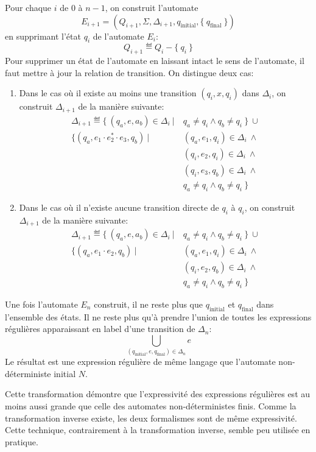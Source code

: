Pour chaque $i$ de $0$ à $n-1$, on construit l'automate \[E_{i+1} = (Q_{i+1}, \Sigma, \Delta_{i+1}, q_\text{initial}, \{\ q_\text{final}\ \})\] en supprimant l'état $q_i$ de l'automate $E_i$:
\[
Q_{i+1} \eqdef Q_i - \{\ q_i\ \}
\]
Pour supprimer un état de l'automate en laissant intact le sens de l'automate, il faut mettre à jour la relation de transition.
On distingue deux cas:
\begin{enumerate}
\item Dans le cas où il existe au moins une transition $(q_i, x, q_i)$ dans $\Delta_i$, on construit $\Delta_{i+1}$ de la manière suivante:
\begin{align*}
\Delta_{i+1} \eqdef \{\ (q_a, e, a_b) \in \Delta_i\ |\ &q_a \neq q_i \wedge q_b \neq q_i\ \}\ \cup\\
\{ (q_a, e_1 \cdot e_2^* \cdot e_3, q_b)\ |\ &(q_a, e_1, q_i) \in \Delta_i\ \wedge\\
&(q_i, e_2, q_i) \in \Delta_i\ \wedge\\
&(q_i, e_3, q_b) \in \Delta_i\ \wedge\\
&q_a \neq q_i \wedge q_b \neq q_i\ \}
\end{align*}
\item
Dans le cas où il n'existe aucune transition directe de $q_i$ à $q_i$, on construit $\Delta_{i+1}$ de la manière suivante:
\begin{align*}
\Delta_{i+1} \eqdef \{\ (q_a, e, a_b) \in \Delta_i\ |\ &q_a \neq q_i \wedge q_b \neq q_i\ \}\ \cup\\
\{ (q_a, e_1 \cdot e_2, q_b)\ |\ &(q_a, e_1, q_i) \in \Delta_i\ \wedge\\
&(q_i, e_2, q_b) \in \Delta_i\ \wedge\\
&q_a \neq q_i \wedge q_b \neq q_i\ \}
\end{align*}
\end{enumerate}

Une fois l'automate $E_n$ construit, il ne reste plus que $q_\text{initial}$ et $q_\text{final}$ dans l'ensemble des états.
Il ne reste plus qu'à prendre l'union de toutes les expressions régulières apparaissant en label d'une transition de $\Delta_n$:
\[
\bigcup_{(q_\text{initial}, e, q_\text{final}) \in \Delta_n} e
\]
Le résultat est une expression régulière de même langage que l'automate non-déterministe initial $N$.

Cette transformation démontre que l'expressivité des expressions régulières est au moins aussi grande que celle des automates non-déterministes finis.
Comme la transformation inverse existe, les deux formalismes sont de même expressivité.
Cette technique, contrairement à la transformation inverse, semble peu utilisée en pratique.

